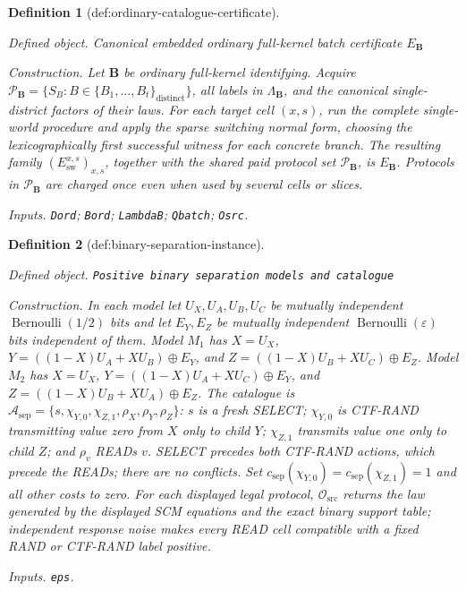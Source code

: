 \documentclass{article}
\newtheorem{definition}{Definition}
\begin{document}
\begin{definition}[def:ordinary-catalogue-certificate]\label{def:ordinary-catalogue-certificate}
\par\smallskip\noindent\emph{Defined object.} Canonical embedded ordinary full-kernel batch certificate \(E_{\mathbf B}\)
\par\smallskip\noindent\emph{Construction.} Let \(\mathbf B\) be ordinary full-kernel identifying.  Acquire \(\mathcal P_{\mathbf B}=\{S_B:B\in\{B_1,\ldots,B_t\}_{\mathrm{distinct}}\}\), all labels in \(\Lambda_{\mathbf B}\), and the canonical single-district factors of their laws.  For each target cell \((x,s)\), run the complete single-world procedure and apply the sparse switching normal form, choosing the lexicographically first successful witness for each concrete branch.  The resulting family \((E_{\mathrm{sw}}^{x,s})_{x,s}\), together with the shared paid protocol set \(\mathcal P_{\mathbf B}\), is \(E_{\mathbf B}\).  Protocols in \(\mathcal P_{\mathbf B}\) are charged once even when used by several cells or slices.
\par\smallskip\noindent\emph{Inputs.} \texttt{Dord}; \texttt{Bord}; \texttt{LambdaB}; \texttt{Qbatch}; \texttt{Osrc}.
\end{definition}

\begin{definition}[def:binary-separation-instance]\label{def:binary-separation-instance}
\par\smallskip\noindent\emph{Defined object.} \texttt{Positive binary separation models and catalogue}
\par\smallskip\noindent\emph{Construction.} In each model let \(U_X,U_A,U_B,U_C\) be mutually independent \(\operatorname{Bernoulli}(1/2)\) bits and let \(E_Y,E_Z\) be mutually independent \(\operatorname{Bernoulli}(\varepsilon)\) bits independent of them. Model \(M_1\) has \(X=U_X\), \(Y=((1-X)U_A+XU_B)\oplus E_Y\), and \(Z=((1-X)U_B+XU_C)\oplus E_Z\). Model \(M_2\) has \(X=U_X\), \(Y=((1-X)U_A+XU_C)\oplus E_Y\), and \(Z=((1-X)U_B+XU_A)\oplus E_Z\). The catalogue is \(\mathcal A_{\mathrm{sep}}=\{s,\chi_{Y,0},\chi_{Z,1},\rho_X,\rho_Y,\rho_Z\}\): \(s\) is a fresh SELECT; \(\chi_{Y,0}\) is CTF-RAND transmitting value zero from \(X\) only to child \(Y\); \(\chi_{Z,1}\) transmits value one only to child \(Z\); and \(\rho_v\) READs \(v\). SELECT precedes both CTF-RAND actions, which precede the READs; there are no conflicts. Set \(c_{\mathrm{sep}}(\chi_{Y,0})=c_{\mathrm{sep}}(\chi_{Z,1})=1\) and all other costs to zero. For each displayed legal protocol, \(\mathcal O_{\mathrm{src}}\) returns the law generated by the displayed SCM equations and the exact binary support table; independent response noise makes every READ cell compatible with a fixed RAND or CTF-RAND label positive.
\par\smallskip\noindent\emph{Inputs.} \texttt{eps}.
\end{definition}
\end{document}
